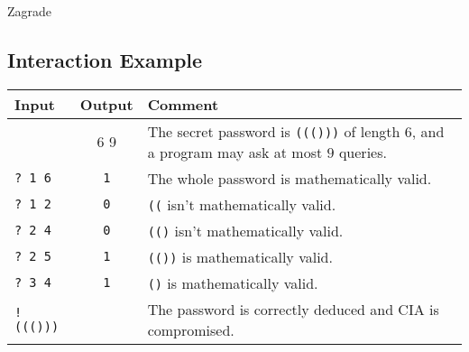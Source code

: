\begin{statement}[
  problempoints=100,
  timelimit=3 seconds,
  memorylimit=512 MiB,
]{Zagrade}
\subsection*{Interaction Example}
{\renewcommand{\arraystretch}{1.4}
  \setlength{\tabcolsep}{6pt}
  \begin{tabular}{lcl}
    Input & Output & Comment \\ \midrule
      & 6 9 & The secret password is \texttt{((()))} of length 6, and a program may ask at most $9$ queries. \\
    \texttt{\frenchspacing? 1 6} & \texttt{1} & The whole password is mathematically valid. \\
    \texttt{\frenchspacing? 1 2} & \texttt{0} & \texttt{((} isn't mathematically valid. \\
    \texttt{\frenchspacing? 2 4} & \texttt{0} & \texttt{(()} isn't mathematically valid. \\
    \texttt{\frenchspacing? 2 5} & \texttt{1} & \texttt{(())} is mathematically valid. \\
    \texttt{\frenchspacing? 3 4} & \texttt{1} & \texttt{()} is mathematically valid. \\
    \texttt{\frenchspacing! ((()))} & & The password is correctly deduced and CIA is compromised. \\
\end{tabular}}

\end{statement}

